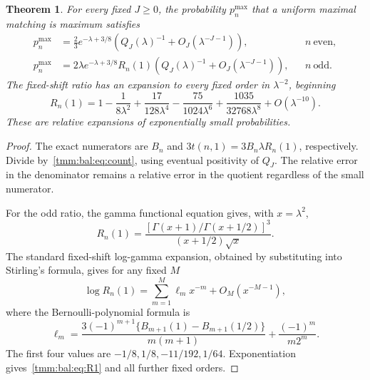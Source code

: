 \documentclass[11pt,letterpaper]{article}
\newtheorem{theorem}{Theorem}[section]
\theoremstyle{remark}\newtheorem{remark}[theorem]{Remark}
\begin{document}
\begin{theorem}\label{tmm:bal:thm:rare}
For every fixed $J\ge0$, the probability $p_n^{\max}$ that a uniform maximal matching is maximum satisfies
\begin{align}
 p_n^{\max}
 &=\frac23e^{-\lambda+3/8}
       \left(Q_J(\lambda)^{-1}+O_J(\lambda^{-J-1})\right),
       &&n\ \text{even},\label{tmm:bal:eq:evenrare}\\
 p_n^{\max}
 &=2\lambda e^{-\lambda+3/8}R_n(1)
       \left(Q_J(\lambda)^{-1}+O_J(\lambda^{-J-1})\right),
       &&n\ \text{odd}.\label{tmm:bal:eq:oddrare}
\end{align}
The fixed-shift ratio has an expansion to every fixed order in $\lambda^{-2}$, beginning
\begin{equation}\label{tmm:bal:eq:R1}
 R_n(1)=1-\frac1{8\lambda^2}+\frac{17}{128\lambda^4}
           -\frac{75}{1024\lambda^6}+\frac{1035}{32768\lambda^8}
           +O(\lambda^{-10}).
\end{equation}
These are relative expansions of exponentially small probabilities.
\end{theorem}
\begin{proof}
The exact numerators are $B_n$ and $3t(n,1)=3B_n\lambda R_n(1)$, respectively. Divide by~\eqref{tmm:bal:eq:count}, using eventual positivity of $Q_J$. The relative error in the denominator remains a relative error in the quotient regardless of the small numerator.

For the odd ratio, the gamma functional equation gives, with $x=\lambda^2$,
\begin{equation}\label{tmm:bal:eq:R1exact}
 R_n(1)=\frac{[\Gamma(x+1)/\Gamma(x+1/2)]^3}{(x+1/2)\sqrt x}.
\end{equation}
The standard fixed-shift log-gamma expansion, obtained by substituting into Stirling's formula, gives for any fixed $M$
\begin{equation}\label{tmm:bal:eq:shiftgamma}
 \log R_n(1)=\sum_{m=1}^M\ell_m x^{-m}+O_M(x^{-M-1}),
\end{equation}
where the Bernoulli-polynomial formula is
\begin{equation}\label{tmm:bal:eq:ellm}
 \ell_m=\frac{3(-1)^{m+1}\{B_{m+1}(1)-B_{m+1}(1/2)\}}{m(m+1)}
                       +\frac{(-1)^m}{m2^m}.
\end{equation}
The first four values are $-1/8,1/8,-11/192,1/64$. Exponentiation gives~\eqref{tmm:bal:eq:R1} and all further fixed orders.
\end{proof}
\end{document}

